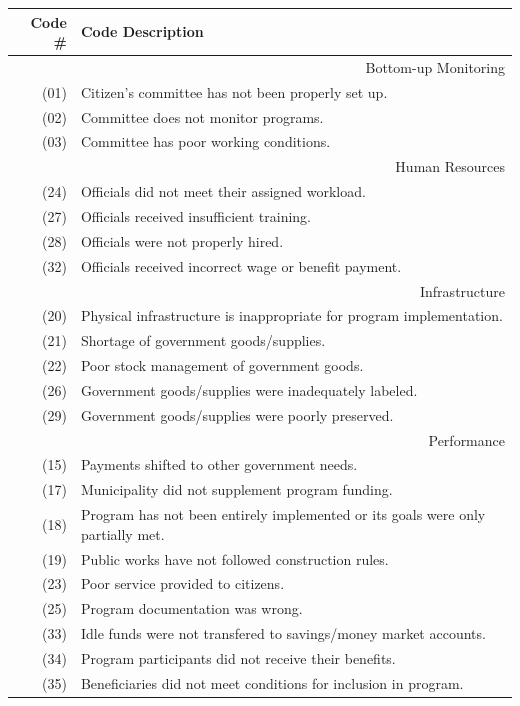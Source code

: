 \documentclass[11pt]{article}
\begin{document}
\begin{table}[!htbp]
\begin{tabular}{r|l}
  \hline
  Code \#& Code Description \\
  \hline
  \multicolumn{2}{r}{Bottom-up Monitoring} \\
  \hline
   (01) & Citizen's committee has not been properly set up. \\
   (02) & Committee does not monitor programs. \\
   (03) & Committee has poor working conditions. \\
  \hline
  \multicolumn{2}{r}{Human Resources} \\
  \hline
   (24) & Officials did not meet their assigned workload. \\
   (27) & Officials received insufficient training. \\
   (28) & Officials were not properly hired. \\
   (32) & Officials received incorrect wage or benefit payment. \\
  \hline
  \multicolumn{2}{r}{Infrastructure} \\
  \hline
   (20) & Physical infrastructure is inappropriate for program implementation. \\
   (21) & Shortage of government goods/supplies. \\
   (22) & Poor stock management of government goods. \\
   (26) & Government goods/supplies were inadequately labeled. \\
   (29) & Government goods/supplies were poorly preserved. \\
  \hline
  \multicolumn{2}{r}{Performance} \\
  \hline
   (15) & Payments shifted to other government needs. \\
   (17) & Municipality did not supplement program funding. \\
   (18) & Program has not been entirely implemented or its goals were only partially met. \\
   (19) & Public works have not followed construction rules. \\
   (23) & Poor service provided to citizens. \\
   (25) & Program documentation was wrong. \\
   (33) & Idle funds were not transfered to savings/money market accounts. \\
   (34) & Program participants did not receive their benefits. \\
   (35) & Beneficiaries did not meet conditions for inclusion in program. \\

\end{tabular}
\end{table}
\end{document}
